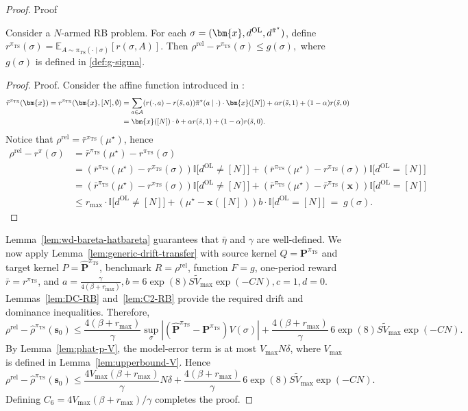 \documentclass[mnsc,nonblindrev]{informs3}
\newcommand{\E}{\mathbb{E}}
\newcommand{\bp}{\bm{P}}
\newcommand{\bphat}{\widehat{\bm{P}}}
\newcommand{\pibst}{\Bar{\pi}^\star}
\newcommand{\pits}{\pi_{\mathrm{TS}}}
\newcommand{\bms}{\bm{s}}
\newcommand{\bmx}{\bm{x}}
\newcommand{\rhorel}{\rho^{\mathrm{rel}}}
\newcommand{\Actions}{\mathcal{A}}
\begin{document}
\begin{APPENDICES}
\begin{proof}{Proof}
\begin{lemma}\label{lem:C2-RB}
Consider a $N$-armed RB problem. For each \( \sigma=(\bmx,d^{\mathrm{OL}},d^{\pibst})\), define 
$
    r^{\pits}(\sigma)=\E_{A\sim \pits(\cdot\mid\sigma)}[r(\sigma,A)].
$
Then
    $
        \rho^{\mathrm{rel}}-r^{\pits}(\sigma)\le g(\sigma),
    $
    where $g(\sigma)$ is defined in \eqref{def:g-sigma}. 
\end{lemma}
\begin{proof}{Proof.}
    Consider the affine function introduced in \citet{hong2024achieving}:
    \begin{align*}
        \bar r^{\pits}(\bmx)=r^{\pits}(\bmx,[N],\emptyset) & = \sum_{a\in\Actions}(r(\cdot,a)-r(\tilde s,a))\pibst(a\mid \cdot)\cdot \bmx([N])+\alpha r(\tilde s,1)+(1-\alpha)r(\tilde s,0)\\
        &=\bmx([N])\cdot b+\alpha r(\tilde s,1)+(1-\alpha)r(\tilde s,0).
    \end{align*}
    Notice that $\rho^{\mathrm{rel}}=\bar r^{\pits}(\mu^\star)$, hence
    \begin{align*}
        \rho^{\mathrm{rel}}-r^{\pi}(\sigma) & =\bar r^{\pits}(\mu^\star)-r^{\pits}(\sigma) \\
         & =(\bar r^{\pits}(\mu^\star)-r^{\pits}(\sigma))\mathbb{I}\big[d^{\mathrm{OL}}\ne [N]\big] + (\bar r^{\pits}(\mu^\star)-r^{\pits}(\sigma))\mathbb{I}\big[d^{\mathrm{OL}}= [N]\big] \\
         & = (\bar r^{\pits}(\mu^\star)-r^{\pits}(\sigma))\mathbb{I}\big[d^{\mathrm{OL}}\ne [N]\big] + (\bar r^{\pits}(\mu^\star)-\bar r^{\pits}(\bmx))\mathbb{I}\big[d^{\mathrm{OL}}= [N]\big] \\
         & \le r_{\max}\cdot \mathbb{I}\big[d^{\mathrm{OL}}\ne [N]\big]+ (\mu^\star-\bmx([N]))b\cdot\mathbb{I}\big[d^{\mathrm{OL}}= [N]\big]
          \;=\; g(\sigma).
    \end{align*}
\end{proof}

Lemma~\ref{lem:wd-bareta-hatbareta} guarantees that $\bar\eta$ and $\gamma$ are well-defined. We now apply Lemma~\ref{lem:generic-drift-transfer} with source kernel $Q=\bp^{\pits}$ and target kernel $P=\bphat^{\pits}$, benchmark $R=\rhorel$, function $F=g$, one-period reward $\bar r=r^{\pits}$, and
\(
a=\frac{\gamma}{4(\beta+r_{\max})}, b=6\exp(8)S\tilde V_{\max}\exp(-CN), c=1, d=0.
\)
Lemmas~\ref{lem:DC-RB} and~\ref{lem:C2-RB} provide the required drift and dominance inequalities. Therefore,
\[
    \rhorel-\widehat\rho^{\pits}(\bms_0)
    \le
    \frac{4(\beta+r_{\max})}{\gamma}\sup_\sigma |(\bphat^{\pits}-\bp^{\pits})V(\sigma)|
    +\frac{4(\beta+r_{\max})}{\gamma}\,6\exp(8)S\tilde V_{\max}\exp(-CN).
\]
By Lemma~\ref{lem:phat-p-V}, the model-error term is at most $V_{\max}N\delta$, where $V_{\max}$ is defined in Lemma~\ref{lem:upperbound-V}. Hence
\[
    \rhorel-\widehat\rho^{\pits}(\bms_0)
    \le
    \frac{4V_{\max}(\beta+r_{\max})}{\gamma}N\delta
    +\frac{4(\beta+r_{\max})}{\gamma}\,6\exp(8)S\tilde V_{\max}\exp(-CN).
\]
Defining $C_6=4V_{\max}(\beta+r_{\max})/\gamma$ completes the proof.
\end{proof}





\end{APPENDICES}
\end{document}
